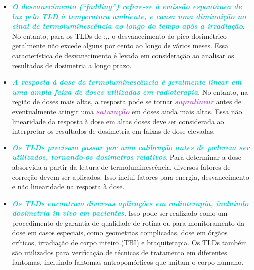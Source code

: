 \documentclass[11pt,a4paper]{article}
\newcounter{exemplo}
\begin{document}
\begin{exemplo}
\begin{itemize}
			\item \textcolor{DarkTurquoise}{\textit{\textbf{O desvanecimento (\textit{``fadding''}) refere-se à emissão espontânea de luz pelo TLD à temperatura ambiente, e causa uma diminuição no sinal de termoluminescência ao longo do tempo após a irradiação}}}. No entanto, para os TLDs de :,, o desvanecimento do pico dosimétrico geralmente não excede alguns por cento ao longo de vários meses. Essa característica de desvanecimento é levada em consideração ao analisar os resultados de dosimetria a longo prazo.
		  
			\item \textcolor{DarkTurquoise}{\textit{\textbf{A resposta à dose da termoluminescência é geralmente linear em uma ampla faixa de doses utilizadas em radioterapia}}}. No entanto, na região de doses mais altas, a resposta pode se tornar \textcolor{MediumOrchid}{\textit{\textbf{supralinear}}} antes de eventualmente atingir uma \textcolor{MediumOrchid}{\textit{\textbf{saturação}}} em doses ainda mais altas. Essa não linearidade da resposta à dose em altas doses deve ser considerada ao interpretar os resultados de dosimetria em faixas de dose elevadas.
			
			\item \textcolor{DarkTurquoise}{\textit{\textbf{Os TLDs precisam passar por uma calibração antes de poderem ser utilizados, tornando-os dosímetros relativos}}}. Para determinar a dose absorvida a partir da leitura de termoluminescência, diversos fatores de correção devem ser aplicados. Isso inclui fatores para energia, desvanecimento e não linearidade na resposta à dose.
			
			\item \textcolor{DarkTurquoise}{\textit{\textbf{Os TLDs encontram diversas aplicações em radioterapia, incluindo dosimetria in vivo em pacientes}}}. Isso pode ser realizado como um procedimento de garantia de qualidade de rotina ou para monitoramento da dose em casos especiais, como geometrias complicadas, dose em órgãos críticos, irradiação de corpo inteiro (TBI) e braquiterapia. Os TLDs também são utilizados para verificação de técnicas de tratamento em diferentes fantomas, incluindo fantomas antropomórficos que imitam o corpo humano.
			
		  \end{itemize}
	\end{exemplo}
\end{document}
